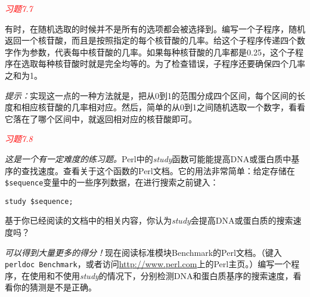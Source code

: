 \textcolor{red}{\textit{习题7.7}}
\begin{adjustwidth}{1cm}{}
有时，在随机选取的时候并不是所有的选项都会被选择到。编写一个子程序，随机返回一个核苷酸，而且是按照指定的每个核苷酸的几率。给这个子程序传递四个数字作为参数，代表每中核苷酸的几率。如果每种核苷酸的几率都是0.25，这个子程序在选取每种核苷酸时就是完全均等的。为了检查错误，子程序还要确保四个几率之和为1。

\textit{提示：}实现这一点的一种方法就是，把从0到1的范围分成四个区间，每个区间的长度和相应核苷酸的几率相对应。然后，简单的从0到1之间随机选取一个数字，看看它落在了哪个区间中，就返回相对应的核苷酸即可。
\end{adjustwidth}

\textcolor{red}{\textit{习题7.8}}
\begin{adjustwidth}{1cm}{}
\textit{这是一个有一定难度的练习题。}Perl中的\textit{study}函数可能能提高DNA或蛋白质中基序的查找速度。查看关于这个函数的Perl文档。它的用法非常简单：给定存储在\verb|$sequence|变量中的一些序列数据，在进行搜索之前键入：

\begin{lstlisting}
study $sequence;
\end{lstlisting}

基于你已经阅读的文档中的相关内容，你认为\textit{study}会提高DNA或蛋白质的搜索速度吗？
\end{adjustwidth}

\textit{可以得到大量更多的得分！}现在阅读标准模块Benchmark的Perl文档。（键入\verb|perldoc Benchmark|，或者访问\href{http://www.perl.com}{http://www.perl.com}上的Perl主页。）编写一个程序，在使用和不使用\textit{study}的情况下，分别检测DNA和蛋白质基序的搜索速度，看看你的猜测是不是正确。
